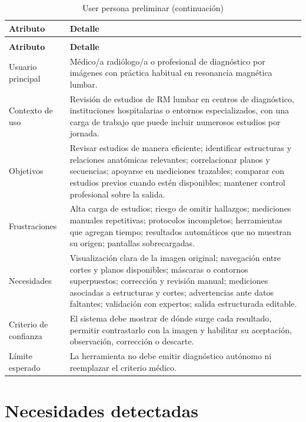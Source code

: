 {\small
\setlength{\LTleft}{0pt}
\setlength{\LTright}{0pt}
\renewcommand{\arraystretch}{1.18}
\setlength{\tabcolsep}{3pt}
\begin{longtable}{>{\raggedright\arraybackslash}p{} >{\raggedright\arraybackslash}p{}}
\caption{User persona preliminar}\label{tab:user-persona}\\
\hline
\textbf{Atributo} & \textbf{Detalle} \\
\hline
\endfirsthead
\caption[]{User persona preliminar (continuación)}\\
\hline
\textbf{Atributo} & \textbf{Detalle} \\
\hline
\endhead
\hline
\endfoot
Usuario principal & Médico/a radiólogo/a o profesional de diagnóstico por imágenes con práctica habitual en resonancia magnética lumbar. \\
Contexto de uso & Revisión de estudios de RM lumbar en centros de diagnóstico, instituciones hospitalarias o entornos especializados, con una carga de trabajo que puede incluir numerosos estudios por jornada. \\
Objetivos & Revisar estudios de manera eficiente; identificar estructuras y relaciones anatómicas relevantes; correlacionar planos y secuencias; apoyarse en mediciones trazables; comparar con estudios previos cuando estén disponibles; mantener control profesional sobre la salida. \\
Frustraciones & Alta carga de estudios; riesgo de omitir hallazgos; mediciones manuales repetitivas; protocolos incompletos; herramientas que agregan tiempo; resultados automáticos que no muestran su origen; pantallas sobrecargadas. \\
Necesidades & Visualización clara de la imagen original; navegación entre cortes y planos disponibles; máscaras o contornos superpuestos; corrección y revisión manual; mediciones asociadas a estructuras y cortes; advertencias ante datos faltantes; validación con expertos; salida estructurada editable. \\
Criterio de confianza & El sistema debe mostrar de dónde surge cada resultado, permitir contrastarlo con la imagen y habilitar su aceptación, observación, corrección o descarte. \\
Límite esperado & La herramienta no debe emitir diagnóstico autónomo ni reemplazar el criterio médico. \\
\hline
\end{longtable}
}

\section{Necesidades detectadas}

